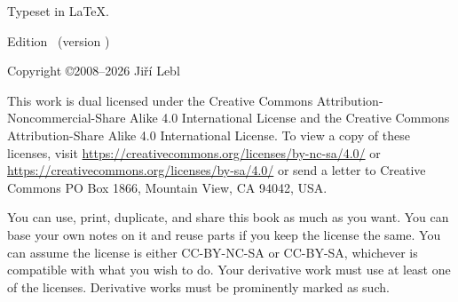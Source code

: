 \documentclass[12pt]{book}
\begin{document}
\begin{small}
\noindent
Typeset in \LaTeX.

\bigskip

\noindent
Edition \theedition\ (version \theversion)

\bigskip

\noindent
Copyright \copyright 2008--2026 Ji\v{r}\'i Lebl


%


\bigskip

\noindent
{}
\quad
{}

\bigskip

\noindent
This work
is dual licensed under
the Creative Commons
Attribution-Non\-commercial-Share Alike 4.0 International License and
the Creative Commons
Attribution-Share Alike 4.0 International License.
To view a
copy of these licenses, visit
\url{https://creativecommons.org/licenses/by-nc-sa/4.0/}
or
\url{https://creativecommons.org/licenses/by-sa/4.0/}
or send a letter to
Creative Commons
PO Box 1866, Mountain View, CA 94042, USA\@.

\bigskip

\noindent
You can use, print, duplicate, and share this book as much as you want.  You can
base your own notes on it and reuse parts if you keep the license the
same.  You can assume the license is either CC-BY-NC-SA or CC-BY-SA\@,
whichever is compatible with what you wish to do.
Your derivative work must use at least one of the licenses.
Derivative works must be prominently marked as such.


\end{small}
\end{document}
